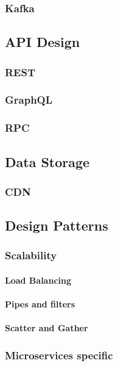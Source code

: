 \documentclass[a4paper, 11pt]{book}
\begin{document}
    \subsubsection{Kafka}

    \subsection{API Design}

    \subsubsection{REST}

    \subsubsection{GraphQL}

    \subsubsection{RPC}

    \subsection{Data Storage}

    \subsubsection{CDN}

    \subsection{Design Patterns}
    \lipsum[4]
    \subsubsection{Scalability}
    \paragraph{Load Balancing}
    \paragraph{Pipes and filters}
    \paragraph{Scatter and Gather}
    \subsubsection{Microservices specific}
\end{document}
